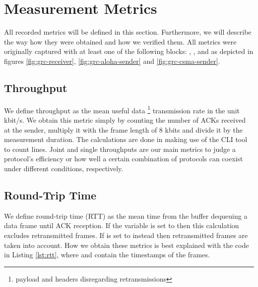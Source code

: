 \clearpage

\section{Measurement Metrics}
\label{sec:measurement-metrics}

All recorded metrics will be defined in this section. Furthermore, we will describe the way how they were obtained and how we verified them. All metrics were originally captured with at least one of the following blocks: , ,  and  as depicted in figures \ref{fig:grc-receiver}, \ref{fig:grc-aloha-sender} and \ref{fig:grc-csma-sender}.

\subsection{Throughput}

We define throughput as the mean useful data \footnote{payload and headers disregarding retransmissions} transmission rate in the unit kbit/s. We obtain this metric simply by counting the number of ACKs received at the sender, multiply it with the frame length of 8 kbits and divide it by the measurement duration. The calculations are done in  making use of the CLI tool  to count lines. Joint and single throughputs are our main metrics to judge a protocol's efficiency or how well a certain combination of protocols can coexist under different conditions, respectively.

\subsection{Round-Trip Time}

We define round-trip time (RTT) as the mean time from the buffer dequeuing a data frame until ACK reception. If the variable  is set to  then this calculation excludes retransmitted frames. If  is set to  instead then retransmitted frames are taken into account. How we obtain these metrics is best explained with the code in Listing \ref{lst:rtt}, where  and  contain the timestamps of the frames. 

